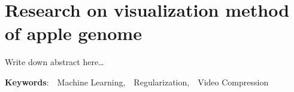 \thispagestyle{empty}
\chapter*{Research on visualization method of apple genome}
\linespread{1.25} 
\vspace{1em}

Write down abstract here\ldots

\vspace{1em}

\noindent\textbf{Keywords}:~~Machine Learning,~~Regularization,~~Video Compression

\linespread{1.5} 
